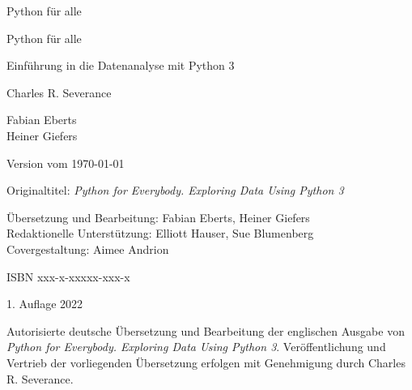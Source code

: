 
\begin{titlepage}
\begin{center}
\vspace*{15mm}

\sffamily
\LARGE
Python für alle

\end{center}
\end{titlepage}


\cleardoublepage
\thispagestyle{plain}

\begin{center}
\vspace*{15mm}

\sffamily
\LARGE
Python für alle

\large
Einführung in die Datenanalyse mit Python 3

\vspace{15mm}

\large
Charles R. Severance

\vspace{20mm}

\normalsize
Fabian Eberts\\
Heiner Giefers

\vspace{105mm}

\normalsize
Version vom \today

\end{center}

\normalsize
\normalfont


\clearpage
\thispagestyle{plain}

Originaltitel: \textit{Python for Everybody. Exploring Data Using Python 3}
\bigskip

Übersetzung und Bearbeitung: Fabian Eberts, Heiner Giefers\\
Redaktionelle Unterstützung: Elliott Hauser, Sue Blumenberg\\
Covergestaltung: Aimee Andrion
\bigskip

ISBN xxx-x-xxxxx-xxx-x
\bigskip

1. Auflage 2022

Autorisierte deutsche Übersetzung und Bearbeitung der englischen Ausgabe von \textit{Python for Everybody. Exploring Data Using Python 3}. Veröffentlichung und Vertrieb der vorliegenden Übersetzung erfolgen mit Genehmigung durch Charles R. Severance.
\bigskip

